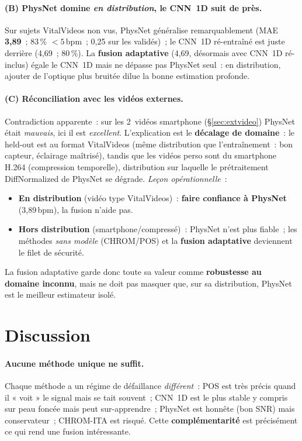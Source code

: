 \documentclass[11pt,a4paper]{article}
\begin{document}
\paragraph{(B) PhysNet domine \emph{en distribution}, le CNN~1D suit de près.} Sur
sujets VitalVideos non vus, PhysNet généralise remarquablement (MAE \textbf{3,89}~;
83\,\% $<5$\,bpm~; 0,25 sur les validés)~; le CNN~1D ré-entraîné est juste derrière
(4,69~; 80\,\%). La \textbf{fusion adaptative} (4,69, désormais avec CNN~1D ré-inclus)
égale le CNN~1D mais ne dépasse pas PhysNet seul~: en distribution, ajouter de
l'optique plus bruitée dilue la bonne estimation profonde.

\paragraph{(C) Réconciliation avec les vidéos externes.} Contradiction apparente~:
sur les 2~vidéos smartphone (§\ref{sec:extvideo}) PhysNet était \emph{mauvais},
ici il est \emph{excellent}. L'explication est le \textbf{décalage de domaine}~: le
held-out est au format VitalVideos (même distribution que l'entraînement~: bon
capteur, éclairage maîtrisé), tandis que les vidéos perso sont du smartphone H.264
(compression temporelle), distribution sur laquelle le prétraitement DiffNormalized
de PhysNet se dégrade. \emph{Leçon opérationnelle}~:
\begin{itemize}[leftmargin=1.4em]
\item \textbf{En distribution} (vidéo type VitalVideos)~: \textbf{faire confiance à
PhysNet} (3,89\,bpm), la fusion n'aide pas.
\item \textbf{Hors distribution} (smartphone/compressé)~: PhysNet n'est plus
fiable~; les méthodes \emph{sans modèle} (CHROM/POS) et la \textbf{fusion
adaptative} deviennent le filet de sécurité.
\end{itemize}
La fusion adaptative garde donc toute sa valeur comme \textbf{robustesse au domaine
inconnu}, mais ne doit pas masquer que, sur sa distribution, PhysNet est le
meilleur estimateur isolé.

\section{Discussion}

\paragraph{Aucune méthode unique ne suffit.} Chaque méthode a un régime de
défaillance \emph{différent}~: POS est très précis quand il « voit » le signal
mais se tait souvent~; CNN~1D est le plus stable y compris sur peau foncée mais
peut sur-apprendre~; PhysNet est honnête (bon SNR) mais conservateur~; CHROM-ITA
est risqué. Cette \textbf{complémentarité} est précisément ce qui rend une fusion
intéressante.
\end{document}
